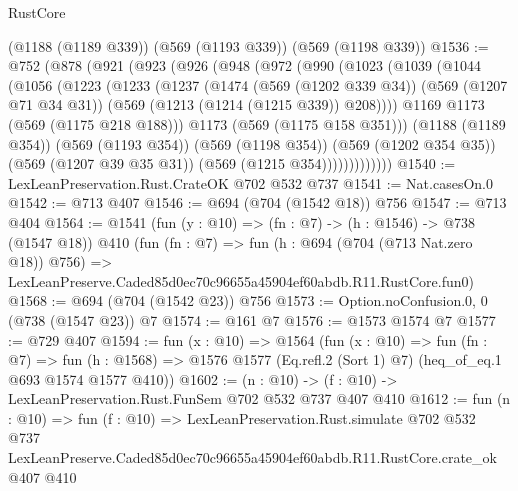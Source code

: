 \begin{lexlean}{RustCore}
\begin{coremodule}
    (@1188 (@1189 @339))
    (@569 (@1193 @339))
    (@569 (@1198 @339))
@1536 := @752
    (@878
      (@921
        (@923
          (@926
            (@948
              (@972
                (@990
                  (@1023
                    (@1039
                      (@1044
                        (@1056
                          (@1223
                            (@1233
                              (@1237
                                (@1474
                                  (@569 (@1202 @339 @34))
                                  (@569 (@1207 @71 @34 @31))
                                  (@569 (@1213 (@1214 (@1215 @339)) @208))))
                              @1169
                              @1173
                              (@569 (@1175 @218 @188)))
                            @1173
                            (@569 (@1175 @158 @351)))
                          (@1188 (@1189 @354))
                          (@569 (@1193 @354))
                          (@569 (@1198 @354))
                          (@569 (@1202 @354 @35))
                          (@569 (@1207 @39 @35 @31))
                          (@569 (@1215 @354)))))))))))))
@1540 := LexLeanPreservation.Rust.CrateOK @702 @532 @737
@1541 := Nat.casesOn.{0}
@1542 := @713 @407
@1546 := @694 (@704 (@1542 @18)) @756
@1547 := @713 @404
@1564 := @1541
    (fun (y : @10) => (fn : @7) -> (h : @1546) -> @738 (@1547 @18))
    @410
    (fun (fn : @7) =>
    fun (h : @694 (@704 (@713 Nat.zero @18)) @756) =>
    LexLeanPreserve.Caded85d0ec70c96655a45904ef60abdb.R11.RustCore.fun0)
@1568 := @694 (@704 (@1542 @23)) @756
@1573 := Option.noConfusion.{0, 0} (@738 (@1547 @23)) @7
@1574 := @161 @7
@1576 := @1573 @1574 @7
@1577 := @729 @407
@1594 := fun (x : @10) =>
  @1564
    (fun (x : @10) =>
    fun (fn : @7) =>
    fun (h : @1568) => @1576 @1577 (Eq.refl.{2} (Sort 1) @7) (heq_of_eq.{1} @693 @1574 @1577 @410))
@1602 := (n : @10) -> (f : @10) -> LexLeanPreservation.Rust.FunSem @702 @532 @737 @407 @410
@1612 := fun (n : @10) =>
  fun (f : @10) =>
  LexLeanPreservation.Rust.simulate
    @702
    @532
    @737
    LexLeanPreserve.Caded85d0ec70c96655a45904ef60abdb.R11.RustCore.crate_ok
    @407
    @410
\end{coremodule}
\end{lexlean}
